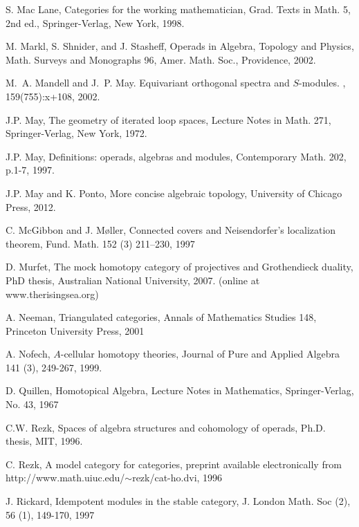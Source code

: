 \documentclass[11pt,reqno]{amsart}
\theoremstyle{definition}
\numberwithin{equation}{subsection}
\begin{document}
\begin{thebibliography}{AAAAAA}
S. Mac Lane, Categories for the working mathematician, Grad. Texts in Math. 5, 2nd ed., Springer-Verlag, New York, 1998.


M. Markl, S. Shnider, and J. Stasheff, Operads in Algebra, Topology and Physics, Math. Surveys and Monographs 96, Amer. Math. Soc., Providence, 2002.

M.~A. Mandell and J.~P. May.
\newblock Equivariant orthogonal spectra and {$S$}-modules.
, 159(755):x+108, 2002.

J.P. May, The geometry of iterated loop spaces, Lecture Notes in Math. 271, Springer-Verlag, New York, 1972.


J.P. May, Definitions: operads, algebras and modules, Contemporary Math. 202, p.1-7, 1997.

 J.P. May and K. Ponto, More concise algebraic topology, University of Chicago Press, 2012.

 C. McGibbon and J. M{\o}ller, Connected covers and {N}eisendorfer's localization theorem, Fund. Math. 152 (3) 211--230, 1997

 D. Murfet, The mock homotopy category of projectives and Grothendieck duality, PhD thesis, Australian National University, 2007. (online at www.therisingsea.org)

 A. Neeman, Triangulated categories, Annals of Mathematics Studies 148, Princeton University Press, 2001

A. Nofech, $A$-cellular homotopy theories, Journal of Pure and Applied Algebra 141 (3), 249-267, 1999.

D. Quillen, Homotopical Algebra, Lecture Notes in Mathematics, Springer-Verlag, No. 43, 1967

C.W. Rezk, Spaces of algebra structures and cohomology of operads, Ph.D. thesis, MIT, 1996.



 C. Rezk, A model category for categories, preprint available electronically from http://www.math.uiuc.edu/$\sim$rezk/cat-ho.dvi, 1996

 J. Rickard, Idempotent modules in the stable category, J. London Math. Soc (2), 56 (1), 149-170, 1997


\end{thebibliography}
\end{document}
